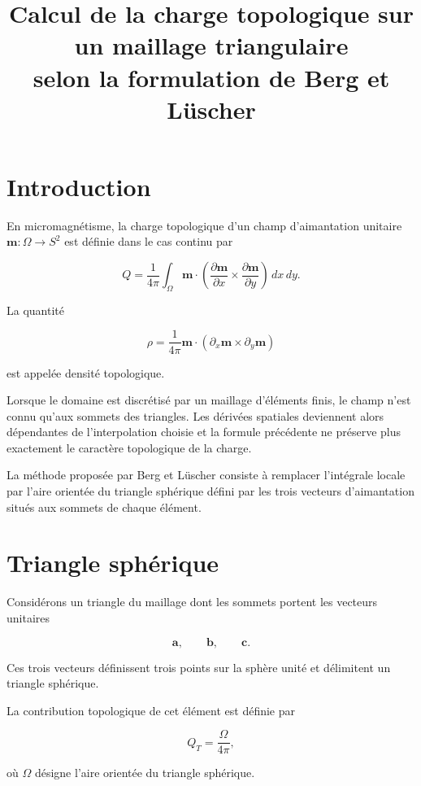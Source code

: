 \documentclass[11pt,a4paper]{article}
\title{Calcul de la charge topologique sur un maillage triangulaire\\
selon la formulation de Berg et Lüscher}
\author{}
\date{}
\begin{document}
\maketitle

\section{Introduction}

En micromagnétisme, la charge topologique d'un champ d'aimantation unitaire
$\mathbf{m}:\Omega\rightarrow S^2$ est définie dans le cas continu par

\begin{equation}
Q=\frac{1}{4\pi}
\int_{\Omega}
\mathbf{m}\cdot
\left(
\frac{\partial\mathbf{m}}{\partial x}
\times
\frac{\partial\mathbf{m}}{\partial y}
\right)
\,dx\,dy.
\end{equation}

La quantité

\[
\rho=
\frac{1}{4\pi}
\mathbf{m}\cdot
(\partial_x\mathbf{m}\times\partial_y\mathbf{m})
\]

est appelée densité topologique.

Lorsque le domaine est discrétisé par un maillage d'éléments finis, le champ
n'est connu qu'aux sommets des triangles. Les dérivées spatiales deviennent
alors dépendantes de l'interpolation choisie et la formule précédente ne
préserve plus exactement le caractère topologique de la charge.

La méthode proposée par Berg et Lüscher consiste à remplacer l'intégrale locale
par l'aire orientée du triangle sphérique défini par les trois vecteurs
d'aimantation situés aux sommets de chaque élément.

\section{Triangle sphérique}

Considérons un triangle du maillage dont les sommets portent les vecteurs
unitaires

\[
\mathbf{a},\qquad
\mathbf{b},\qquad
\mathbf{c}.
\]

Ces trois vecteurs définissent trois points sur la sphère unité et délimitent
un triangle sphérique.

La contribution topologique de cet élément est définie par

\[
Q_T=\frac{\Omega}{4\pi},
\]

où $\Omega$ désigne l'aire orientée du triangle sphérique.
\end{document}

